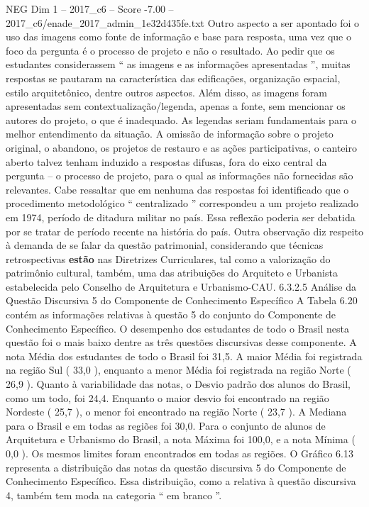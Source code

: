 \begin{textsample}{NEG Dim 1 – 2017\_c6 – Score -7.00 – 2017\_c6/enade\_2017\_admin\_1e32d435fe.txt}
Outro aspecto a ser apontado foi o uso das imagens como fonte de informação e base para resposta, uma vez que o foco da pergunta é o processo de projeto e não o resultado.
Ao pedir que os estudantes considerassem “ as imagens e as informações apresentadas ”, muitas respostas se pautaram na característica das edificações, organização espacial, estilo arquitetônico, dentre outros aspectos.
Além disso, as imagens foram apresentadas sem contextualização/legenda, apenas a fonte, sem mencionar os autores do projeto, o que é inadequado.
As legendas seriam fundamentais para o melhor entendimento da situação.
A omissão de informação sobre o projeto original, o abandono, os projetos de restauro e as ações participativas, o canteiro aberto talvez tenham induzido a respostas difusas, fora do eixo central da pergunta – o processo de projeto, para o qual as informações não fornecidas são relevantes.
Cabe ressaltar que em nenhuma das respostas foi identificado que o procedimento metodológico “ centralizado ” correspondeu a um projeto realizado em 1974, período de ditadura militar no país.
Essa reflexão poderia ser debatida por se tratar de período recente na história do país.
Outra observação diz respeito à demanda de se falar da questão patrimonial, considerando que técnicas retrospectivas \textbf{estão} nas Diretrizes Curriculares, tal como a valorização do patrimônio cultural, também, uma das atribuições do Arquiteto e Urbanista estabelecida pelo Conselho de Arquitetura e Urbanismo-CAU. 6.3.2.5 Análise da Questão Discursiva 5 do Componente de Conhecimento Específico A Tabela 6.20 contém as informações relativas à questão 5 do conjunto do Componente de Conhecimento Específico.
O desempenho dos estudantes de todo o Brasil nesta questão foi o mais baixo dentre as três questões discursivas desse componente.
A nota Média dos estudantes de todo o Brasil foi 31,5.
A maior Média foi registrada na região Sul ( 33,0 ), enquanto a menor Média foi registrada na região Norte ( 26,9 ).
Quanto à variabilidade das notas, o Desvio padrão dos alunos do Brasil, como um todo, foi 24,4.
Enquanto o maior desvio foi encontrado na região Nordeste ( 25,7 ), o menor foi encontrado na região Norte ( 23,7 ).
A Mediana para o Brasil e em todas as regiões foi 30,0.
Para o conjunto de alunos de Arquitetura e Urbanismo do Brasil, a nota Máxima foi 100,0, e a nota Mínima ( 0,0 ).
Os mesmos limites foram encontrados em todas as regiões.
O Gráfico 6.13 representa a distribuição das notas da questão discursiva 5 do Componente de Conhecimento Específico.
Essa distribuição, como a relativa à questão discursiva 4, também tem moda na categoria “ em branco ”.

\end{textsample}
